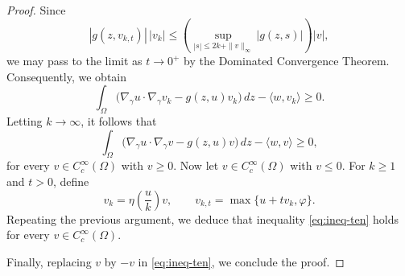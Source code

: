 \documentclass[10pt,a4paper]{amsart}
\newcommand{\gradgr}{\nabla_{\gamma}}
\begin{document}
\begin{proof}
Since
\begin{equation*}
|g(z,v_{k,t})|\,|v_k|
\le
\left(
\sup_{|s|\le 2k + \|v\|_\infty}
|g(z,s)|
\right)
|v|,
\end{equation*}
we may pass to the limit as $t \to 0^{+}$ by the Dominated Convergence Theorem. Consequently, we obtain
\begin{equation*}
\int_\Omega
\big(
\gradgr u \cdot \gradgr v_k
-
g(z,u) v_k
\big)\,dz
-
\langle w , v_k \rangle
\ge 0 .
\end{equation*}
Letting $k \to \infty$, it follows that
\begin{equation}
\label{eq:ineq-ten}
\int_\Omega
\big(
\gradgr u \cdot \gradgr v
-
g(z,u) v
\big)\,dz
-
\langle w , v \rangle
\ge 0 ,
\end{equation}
for every $v \in C_c^\infty(\Omega)$ with $v \ge 0$. Now let $v \in C_c^\infty(\Omega)$ with $v \le 0$. For $k \ge 1$ and $t > 0$, define
\begin{equation*}
v_k = \eta\!\left( \frac{u}{k} \right) v,
\qquad
v_{k,t} = \max \{ u + t v_k , \varphi \}.
\end{equation*}
Repeating the previous argument, we deduce that inequality
\eqref{eq:ineq-ten} holds for every $v \in C_c^\infty(\Omega)$.

Finally, replacing $v$ by $-v$ in \eqref{eq:ineq-ten}, we conclude the proof.
\end{proof}
\end{document}
